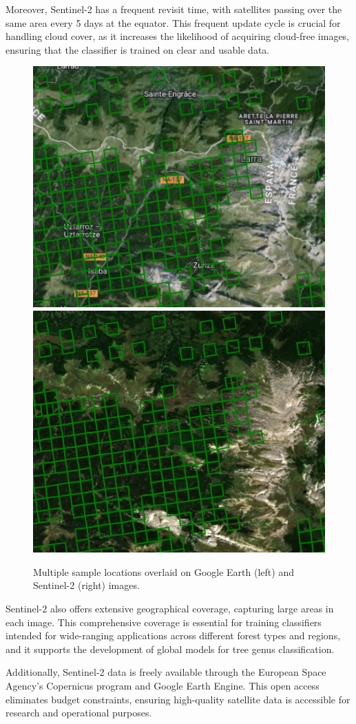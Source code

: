 Moreover, Sentinel-2 has a frequent revisit time, with satellites passing over the same area every 5 days at the equator. This frequent update cycle is crucial for handling cloud cover, as it increases the likelihood of acquiring cloud-free images, ensuring that the classifier is trained on clear and usable data.

\begin{figure}[!thb]
    \centering

    \includegraphics[width=0.48\linewidth]{figures/figures_sentinel/sample_area_earth.png}
    \includegraphics[width=0.48\linewidth]{figures/figures_sentinel/sample_area_sentinel.png}

    \caption{Multiple sample locations overlaid on Google Earth (left) and Sentinel-2 (right) images.}
    \label{fig:label_sample_area}
\end{figure}

Sentinel-2 also offers extensive geographical coverage, capturing large areas in each image. This comprehensive coverage is essential for training classifiers intended for wide-ranging applications across different forest types and regions, and it supports the development of global models for tree genus classification.

Additionally, Sentinel-2 data is freely available through the European Space Agency's Copernicus program and Google Earth Engine. This open access eliminates budget constraints, ensuring high-quality satellite data is accessible for research and operational purposes.

